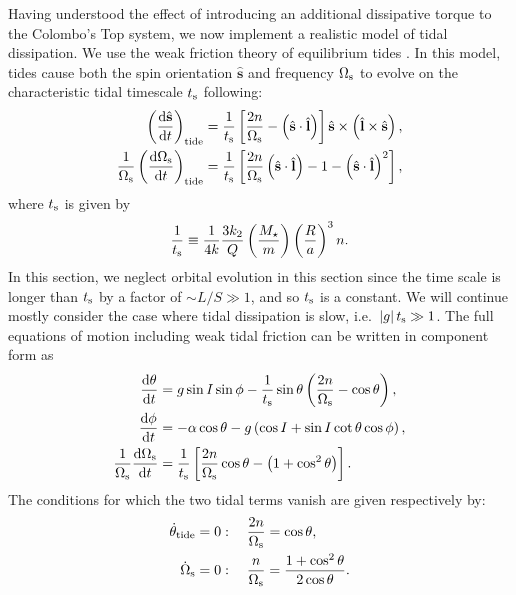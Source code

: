 \documentclass[
        fleqn,
        usenatbib,
    ]{mnras}
\newcommand*{\rd}[2]{\frac{\mathrm{d}#1}{\mathrm{d}#2}}
\newcommand*{\abs}[1]{\left|#1\right|}
\newcommand*{\p}[1]{\left(#1\right)}
\newcommand*{\s}[1]{\left[#1\right]}
\newcommand*{\uv}[1]{\hat{\boldsymbol{\mathbf{#1}}}}
\begin{document}
Having understood the effect of introducing an additional dissipative torque to
the Colombo's Top system, we now implement a realistic model of tidal
dissipation. We use the weak friction theory of equilibrium tides
\citep{lai2012}. In this model, tides cause both the spin orientation $\uv{s}$
and frequency $\Omega_{\rm s}$ to evolve on the characteristic tidal timescale
$t_{\rm s}$ following:
\begin{align}
    \p{\rd{\uv{s}}{t}}_{\rm tide} &= \frac{1}{t_{\rm s}}
                \s{\frac{2n}{\Omega_{\rm s}} - \p{\uv{s} \cdot \uv{l}}}
                    \uv{s} \times \p{\uv{l} \times \uv{s}}\label{eq:dsdt_tide},\\
    \frac{1}{\Omega_{\rm s}}\p{\rd{\Omega_{\rm s}}{t}}_{\rm tide}
        &= \frac{1}{t_{\rm s}} \s{\frac{2n}{\Omega_{\rm s}}\p{\uv{s} \cdot
            \uv{l}} - 1 - \p{\uv{s} \cdot \uv{l}}^2},\label{eq:dWsdt_tide}
\end{align}
where $t_{\rm s}$ is given by
\begin{equation}
    \frac{1}{t_{\rm s}} \equiv \frac{1}{4k}
        \frac{3k_2}{Q}\p{\frac{M_\star}{m}}\p{\frac{R}{a}}^3 n.
\end{equation}
In this section, we neglect orbital evolution in this section since the time
scale is longer than $t_{\rm s}$ by a factor of $\sim L / S \gg 1$, and so
$t_{\rm s}$ is a constant. We will continue mostly consider the case where tidal
dissipation is slow, i.e.\ $\abs{g}t_{\rm s} \gg 1$. The full equations of
motion including weak tidal friction can be written in component form as
\begin{align}
    \rd{\theta}{t} &= g\sin I \sin \phi -
        \frac{1}{t_{\rm s}}\sin \theta\p{\frac{2n}{\Omega_{\rm s}} - \cos \theta}
            ,\label{eq:ds_fullq}\\
    \rd{\phi}{t} &= -\alpha\cos\theta
        - g\p{\cos I + \sin I \cot \theta \cos \phi}\label{eq:ds_fullphi},\\
    \frac{1}{\Omega_{\rm s}}\rd{\Omega_{\rm s}}{t}
        &= \frac{1}{t_{\rm s}} \s{\frac{2n}{\Omega_{\rm s}} \cos \theta
            - \p{1 + \cos^2\theta}}\label{eq:ds_fulls}.
\end{align}
The conditions for which the two tidal terms vanish are given respectively by:
\begin{align}
    \dot{\theta}_{\rm tide} = 0 &: \quad \frac{2n}{\Omega_{\rm s}} = \cos \theta,
        \label{eq:weaktide_dqzero}\\
    \dot{\Omega}_{\rm s} = 0 &: \quad \frac{n}{\Omega_{\rm s}}
        = \frac{1 + \cos^2\theta}{2\cos \theta}.\label{eq:weaktide_dWszero}
\end{align}
\end{document}
